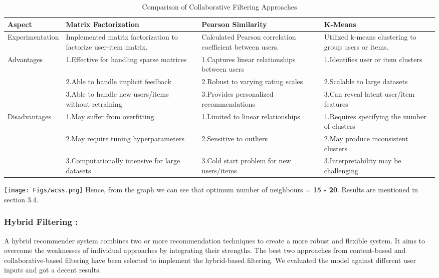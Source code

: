 \documentclass[a4paper]{article}
\theoremstyle{plain}
\theoremstyle{definition}
\begin{document}
\begin{table}[htbp]
\centering
\begin{adjustbox}{max width=\textwidth}
\begin{tabular}{|p{3cm}|p{4.5cm}|p{4.5cm}|p{4.5cm}|}
\hline
\rowcolor{gray!20}
\textbf{Aspect} & \textbf{Matrix Factorization} & \textbf{Pearson Similarity} & \textbf{K-Means} \\
\hline
Experimentation & Implemented matrix factorization to factorize user-item matrix. & Calculated Pearson correlation coefficient between users. & Utilized k-means clustering to group users or items. \\
\hline
Advantages & 1.Effective for handling sparse matrices & 1.Captures linear relationships between users & 1.Identifies user or item clusters \\
 & 2.Able to handle implicit feedback & 2.Robust to varying rating scales & 2.Scalable to large datasets \\
 & 3.Able to handle new users/items without retraining & 3.Provides personalized recommendations & 3.Can reveal latent user/item features \\
\hline
Disadvantages & 1.May suffer from overfitting & 1.Limited to linear relationships & 1.Requires specifying the number of clusters \\
 & 2.May require tuning hyperparameters & 2.Sensitive to outliers & 2.May produce inconsistent clusters \\
 & 3.Computationally intensive for large datasets & 3.Cold start problem for new users/items & 3.Interpretability may be challenging \\
\hline
\end{tabular}
\end{adjustbox}
\caption{Comparison of Collaborative Filtering Approaches}
\label{tab:collab_comparison}
\end{table}

\texttt{[image: Figs/wcss.png]}
Hence, from the graph we can see that optimum number of neighbours = \textbf{15 - 20}. Results are mentioned in section 3.4.

 \subsubsection{Hybrid Filtering : }
 A hybrid recommender system combines two or more recommendation techniques to create a more robust and flexible system. It aims to overcome the weaknesses of individual approaches by integrating their strengths. 
 The best two approaches from content-based and collaborative-based filtering have been selected to implement the hybrid-based filtering. We evaluated the model against different user inputs and got a decent results.
 \bigskip
 \bigskip
 
\end{document}
